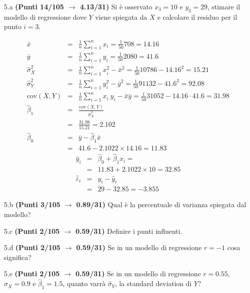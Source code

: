 \documentclass[
  11pt,
]{book}
\theoremstyle{mytheoremstyle}
\theoremstyle{mydefstyle}
\newenvironment{sol}
  {
  \begin{tcolorbox}[enhanced,breakable,arc=0.1mm,boxrule=1pt,colback=white,colframe=iblue,
  title=\bf \fontfamily{lmss}\selectfont \hspace{.5 cm} Soluzione,drop fuzzy shadow]

}{
\end{tcolorbox}
  }
\begin{document}
5.a \textbf{(Punti 14/105 \(\rightarrow\) 4.13/31)} Si è osservato \(x_3=10\) e \(y_3=29\), stimare il modello di regressione dove \(Y\) viene spiegata da \(X\) e calcolare il residuo per il punto \(i=3\).

\begin{sol}
\begin{eqnarray*}
           \bar x &=&\frac 1 n\sum_{i=1}^n x_i = \frac {1}{ 50 }  708 =  14.16 \\
           \bar y &=&\frac 1 n\sum_{i=1}^n y_i = \frac {1}{ 50 }  2080 =  41.6 \\
           \hat\sigma_X^2&=&\frac 1 n\sum_{i=1}^n x_i^2-\bar x^2=\frac {1}{ 50 }  10786  - 14.16 ^2= 15.21 \\
           \hat\sigma_Y^2&=&\frac 1 n\sum_{i=1}^n y_i^2-\bar y^2=\frac {1}{ 50 }  91132  - 41.6 ^2= 92.08 \\
           \text{cov}(X,Y)&=&\frac 1 n\sum_{i=1}^n x_i~y_i-\bar x\bar y=\frac {1}{ 50 }  31052 - 14.16 \cdot 41.6 = 31.98 \\
           \hat\beta_1 &=& \frac{\text{cov}(X,Y)}{\hat\sigma_X^2} \\
                    &=& \frac{ 31.98 }{ 15.21 }  =  2.102 \\
           \hat\beta_0 &=& \bar y - \hat\beta_1 \bar x\\
                    &=&  41.6 - 2.1022 \times  14.16 = 11.83 
         \end{eqnarray*}\begin{eqnarray*}
\hat y_i &=&\hat\beta_0+\hat\beta_1 x_i=\\ 
&=& 11.83 + 2.1022 \times 10 = 32.85 \\ 
\hat \varepsilon_i &=& y_i-\hat y_i\\ 
&=& 29 - 32.85 = -3.855  
\end{eqnarray*}

\end{sol}

5.b \textbf{(Punti 3/105 \(\rightarrow\) 0.89/31)} Qual è la percentuale di varianza spiegata dal modello?

5.c \textbf{(Punti 2/105 \(\rightarrow\) 0.59/31)} Definire i punti influenti.

5.d \textbf{(Punti 2/105 \(\rightarrow\) 0.59/31)} Se in un modello di regressione \(r=-1\) cosa significa?

5.e \textbf{(Punti 2/105 \(\rightarrow\) 0.59/31)} Se in un modello di regressione \(r=0.55\), \(\hat\sigma_X=0.9\) e \(\hat\beta_1=1.5\), quanto varrà
\(\hat\sigma_Y\), la standard deviation di \(Y\)?
\end{document}
